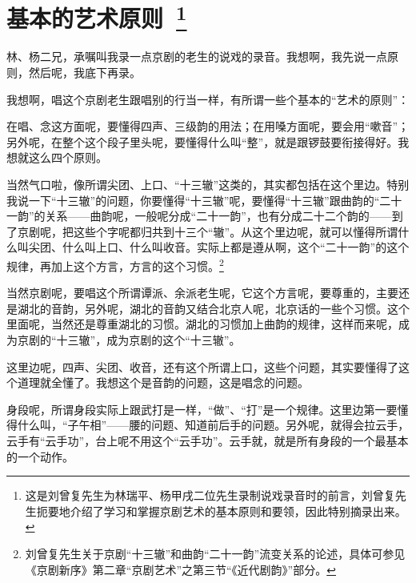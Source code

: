 \newpage
\renewcommand{\thefootnote}{\roman{footnote}}
\setcounter{footnote}{0}
\pagestyle{fancy}    %

\section*{\large\hei 基本的艺术原则~\protect\footnote{这是刘曾复先生为林瑞平、杨甲戌二位先生录制说戏录音时的前言，刘曾复先生扼要地介绍了学习和掌握京剧艺术的基本原则和要领，因此特别摘录出来。}}%

{林、杨二兄，承嘱叫我录一点京剧的老生的说戏的录音。我想啊，我先说一点原则，然后呢，我底下再录。}

{我想啊，唱这个京剧老生跟唱别的行当一样，有所谓一些个基本的``艺术的原则''：}

{在唱、念这方面呢，要懂得四声、三级韵的用法；在用嗓方面呢，要会用``嗽音''；另外呢，在整个这个段子里头呢，要懂得什么叫``整''，就是跟锣鼓要衔接得好。我想就这么四个原则。}

{当然气口啦，像所谓尖团、上口、``十三辙''这类的，其实都包括在这个里边。特别我说一下``十三辙''的问题，你要懂得``十三辙''呢，要懂得``十三辙''跟曲韵的``二十一韵''的关系------曲韵呢，一般呢分成``二十一韵''，也有分成二十二个韵的------到了京剧呢，把这些个字呢都归共到十三个``辙''。从这个里边呢，就可以懂得所谓什么叫尖团、什么叫上口、什么叫收音。实际上都是遵从啊，这个``二十一韵''的这个规律，再加上这个方言，方言的这个习惯。}\footnote{刘曾复先生关于京剧``十三辙''和曲韵``二十一韵''流变关系的论述，具体可参见《京剧新序》第二章``京剧艺术''之第三节``《近代剧韵》''部分。%
}

{当然京剧呢，要唱这个所谓谭派、余派老生呢，它这个方言呢，要尊重的，主要还是湖北的音韵，另外呢，湖北的音韵又结合北京人呢，北京话的一些个习惯。这个里面呢，当然还是尊重湖北的习惯。湖北的习惯加上曲韵的规律，这样而来呢，成为京剧的``十三辙''，成为京剧的这个``十三辙''。}

{这里边呢，四声、尖团、收音，还有这个所谓上口，这些个问题，其实要懂得了这个道理就全懂了。我想这个是音韵的问题，这是唱念的问题。}

{身段呢，所谓身段实际上跟武打是一样，``做''、``打''是一个规律。这里边第一要懂得什么叫，``子午相''------腰的问题、知道前后手的问题。另外呢，就得会拉云手，云手有``云手功''，台上呢不用这个``云手功''。云手就，就是所有身段的一个最基本的一个动作。}

